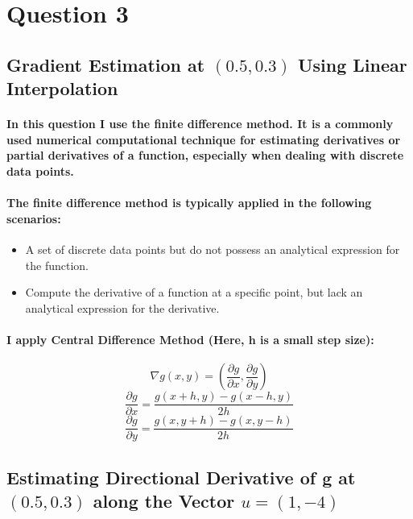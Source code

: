 \section{Question 3}
\subsection{Gradient Estimation at $(0.5, 0.3)$ Using Linear Interpolation}
\paragraph{In this question I use the \textbf{finite difference method}. It is a commonly used numerical computational technique for estimating derivatives or partial derivatives of a function, especially when dealing with discrete data points.}
% 
% 
\paragraph{The finite difference method is typically applied in the following scenarios:}
% 
% 
\begin{itemize}
    \item A set of discrete data points but do not possess an analytical expression for the function.
    \item Compute the derivative of a function at a specific point, but lack an analytical expression for the derivative.
\end{itemize}
% 
\paragraph{I apply Central Difference Method (Here, h is a small step size):}
% 
% 
% 
\begin{equation}
    \nabla g(x,y)=(\frac{\partial g}{\partial x},\frac{\partial g}{\partial y})
\end{equation}
% 
% 
\begin{equation}
    \frac{\partial g}{\partial x}=\frac{g(x+h,y)-g(x-h,y)}{2 h}
\end{equation}
% 
% 
\begin{equation}
    \frac{\partial g}{\partial y}=\frac{g(x,y+h)-g(x,y-h)}{2 h}
\end{equation}
% 
% 
% 
% 
% 
% 
% 
% 
% 
% 
% 
% 
% 
% 
\subsection{Estimating Directional Derivative of g at $(0.5, 0.3)$ along the Vector $u=(1,-4)$}
% 
% 
% 
% 
